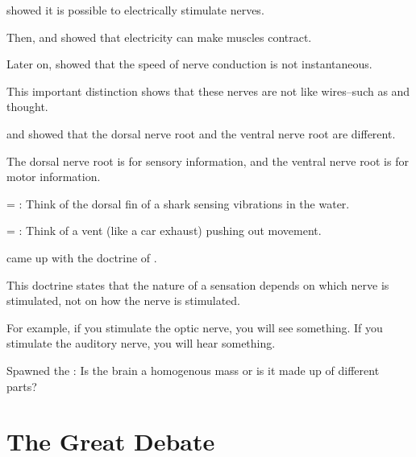 \begin{coloredlist}
    \item \label{person:newton} showed it is possible to electrically stimulate nerves.
    \item Then, \label{{person:galvani}}  and \label{person:bois-reymond} showed that electricity can make muscles contract.
    \item Later on,  showed that the speed of nerve conduction is not instantaneous.
    \item This important distinction shows that these nerves are not like wires--such as  and  thought.
    \item {} and  showed that the dorsal nerve root and the ventral nerve root are different.
    \item The dorsal nerve root is for sensory information, and the ventral nerve root is for motor information.
    \item {} = : Think of the dorsal fin of a shark sensing vibrations in the water.
    \item {} = : Think of a vent (like a car exhaust) pushing out movement.
    \item {} came up with the doctrine of .
    \begin{coloredlist}
        \item This doctrine states that the nature of a sensation depends on which nerve is stimulated, not on how the nerve is stimulated.
        \item For example, if you stimulate the optic nerve, you will see something. If you stimulate the auditory nerve, you will hear something.
    \end{coloredlist}
    \item Spawned the : Is the brain a homogenous mass or is it made up of different parts?
\end{coloredlist}

\section{The Great Debate}

